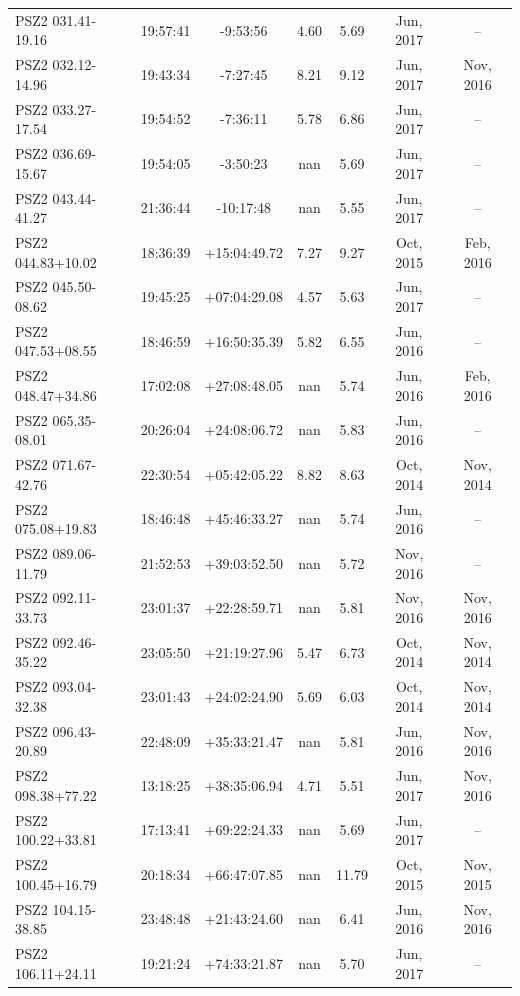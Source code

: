 \documentclass[apj, revtex4]{emulateapj}
\begin{document}
\begin{longtable*}{lcccccc}
PSZ2 031.41-19.16 & 19:57:41 & -9:53:56 & 4.60 & 5.69 & Jun, 2017 & --\\
PSZ2 032.12-14.96 & 19:43:34 & -7:27:45 & 8.21 & 9.12 & Jun, 2017 & Nov, 2016\\
PSZ2 033.27-17.54 & 19:54:52 & -7:36:11 & 5.78 & 6.86 & Jun, 2017 & --\\
PSZ2 036.69-15.67 & 19:54:05 & -3:50:23 & nan & 5.69 & Jun, 2017 & --\\
PSZ2 043.44-41.27 & 21:36:44 & -10:17:48 & nan & 5.55 & Jun, 2017 & --\\
PSZ2 044.83+10.02 & 18:36:39 & +15:04:49.72 & 7.27 & 9.27 & Oct, 2015 & Feb, 2016\\
PSZ2 045.50-08.62 & 19:45:25 & +07:04:29.08 & 4.57 & 5.63 & Jun, 2017 & --\\
PSZ2 047.53+08.55 & 18:46:59 & +16:50:35.39 & 5.82 & 6.55 & Jun, 2016 & --\\
PSZ2 048.47+34.86 & 17:02:08 & +27:08:48.05 & nan & 5.74 & Jun, 2016 & Feb, 2016\\
PSZ2 065.35-08.01 & 20:26:04 & +24:08:06.72 & nan & 5.83 & Jun, 2016 & --\\
PSZ2 071.67-42.76 & 22:30:54 & +05:42:05.22 & 8.82 & 8.63 & Oct, 2014 & Nov, 2014\\
PSZ2 075.08+19.83 & 18:46:48 & +45:46:33.27 & nan & 5.74 & Jun, 2016 & --\\
PSZ2 089.06-11.79 & 21:52:53 & +39:03:52.50 & nan & 5.72 & Nov, 2016 & --\\
PSZ2 092.11-33.73 & 23:01:37 & +22:28:59.71 & nan & 5.81 & Nov, 2016 & Nov, 2016\\
PSZ2 092.46-35.22 & 23:05:50 & +21:19:27.96 & 5.47 & 6.73 & Oct, 2014 & Nov, 2014\\
PSZ2 093.04-32.38 & 23:01:43 & +24:02:24.90 & 5.69 & 6.03 & Oct, 2014 & Nov, 2014\\
PSZ2 096.43-20.89 & 22:48:09 & +35:33:21.47 & nan & 5.81 & Jun, 2016 & Nov, 2016\\
PSZ2 098.38+77.22 & 13:18:25 & +38:35:06.94 & 4.71 & 5.51 & Jun, 2017 & Nov, 2016\\
PSZ2 100.22+33.81 & 17:13:41 & +69:22:24.33 & nan & 5.69 & Jun, 2017 & --\\
PSZ2 100.45+16.79 & 20:18:34 & +66:47:07.85 & nan & 11.79 & Oct, 2015 & Nov, 2015\\
PSZ2 104.15-38.85 & 23:48:48 & +21:43:24.60 & nan & 6.41 & Jun, 2016 & Nov, 2016\\
PSZ2 106.11+24.11 & 19:21:24 & +74:33:21.87 & nan & 5.70 & Jun, 2017 & --\\

\end{longtable*}
\end{document}
